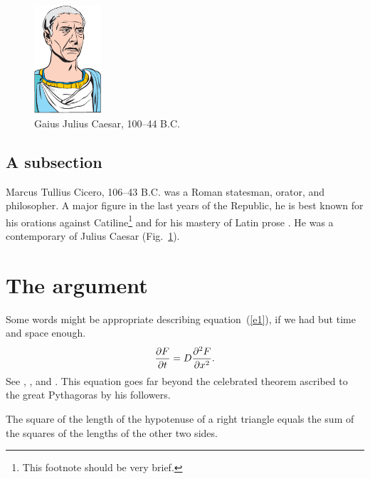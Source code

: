 \documentclass[twocolumn]{autart}    %
\begin{document}
\begin{figure}
\begin{center}
\includegraphics[height=4cm]{jcaesar.eps}    %
\caption{Gaius Julius Caesar, 100--44 B.C.}  %
\label{fig1}                                 %
\end{center}                                 %
\end{figure}




\subsection{A subsection}
Marcus Tullius Cicero, 106--43 B.C. was a Roman statesman, orator, 
and philosopher.  A major figure in the last years of the Republic, 
he is best known for his orations against Catiline\footnote{
This footnote should be very brief.}
and for his mastery of Latin prose \cite{Heritage:92}. He was a 
contemporary of Julius Caesar (Fig.~\ref{fig1}).

\section{The argument}
Some words might be appropriate describing equation~(\ref{e1}), if 
we had but time and space enough.
\begin{equation} \label{e1}
{{\partial F}\over {\partial t}} =
D{{\partial^2 F}\over {\partial x^2}}.
\end{equation}
See \cite{Abl:56}, \cite{AbTaRu:54}, \cite{Keo:58} and 
\cite{Pow:85}.
This equation goes far beyond the celebrated theorem ascribed to the great
Pythagoras by his followers.
\begin{thm}
The square of the length of the hypotenuse of a right triangle equals the sum of the squares 
of the lengths of the other two sides.
\end{thm}
\end{document}
